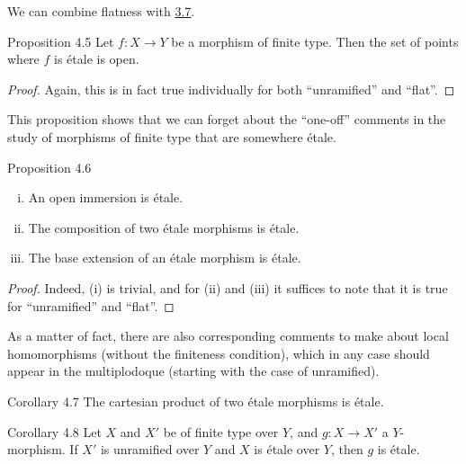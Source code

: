 We can combine flatness with \hyperref[I.3.7]{3.7}.

\begin{itenv}{Proposition 4.5}
\label{I.4.5}
  Let $f\colon X\to Y$ be a morphism of finite type.
  Then the set of points where $f$ is étale is open.
\end{itenv}

\begin{proof}
  Again, this is in fact true individually for both ``unramified'' and ``flat''.
\end{proof}

This proposition shows that we can forget about the ``one-off'' comments in the study of morphisms of finite type that are somewhere étale.

\begin{itenv}{Proposition 4.6}
\label{I.4.6}
  \begin{enumerate}[(i)]
    \item An open immersion is étale.
    \item The composition of two étale morphisms is étale.
    \item The base extension of an étale morphism is étale.
  \end{enumerate}
\end{itenv}

\begin{proof}
  Indeed, (i) is trivial, and for (ii) and (iii) it suffices to note that it is true for ``unramified'' and ``flat''.
\end{proof}

As a matter of fact, there are also corresponding comments to make about local homomorphisms (without the finiteness condition), which in any case should appear in the multiplodoque
(starting with the case of unramified).

\begin{itenv}{Corollary 4.7}
\label{I.4.7}
  The cartesian product of two étale morphisms is étale.
\end{itenv}

\begin{itenv}{Corollary 4.8}
\label{I.4.8}
  Let $X$ and $X'$ be of finite type over $Y$, and $g\colon X\to X'$ a $Y$-morphism.
  If $X'$ is unramified over $Y$ and $X$ is étale over $Y$, then $g$ is étale.
\end{itenv}

